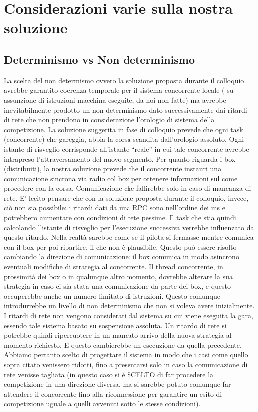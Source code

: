 \section{Considerazioni varie sulla nostra soluzione}
\subsection{Determinismo vs Non determinismo}
La scelta del non determismo ovvero
      la soluzione proposta durante il colloquio avrebbe garantito coerenza temporale per il sistema concorrente locale ( su assunzione di istruzioni macchina eseguite, da noi non fatte) ma avrebbe inevitabilmente prodotto un non determinismo dato successivamente dai ritardi di rete che non prendono in considerazione l’orologio di sistema della competizione. La soluzione suggerita in fase di colloquio prevede che ogni task (concorrente) che gareggia, abbia la corsa scandita dall’orologio assoluto. Ogni istante di risveglio corrisponde all’istante “reale” in cui tale concorrente avrebbe intrapreso l’attraversamento del nuovo segmento. Per quanto riguarda i box (distribuiti), la nostra soluzione prevede che il concorrente instauri una comunicazione sincrona via radio col box per ottenere informazioni sul come procedere con la corsa. Comunicazione che fallirebbe solo in caso di mancanza di rete. E’ lecito pensare che con la soluzione proposta durante il colloquio, invece, ciò non sia possibile: i ritardi dati da una RPC sono nell’ordine dei ms e potrebbero aumentare con condizioni di rete pessime. Il task che stia quindi calcolando l’istante di risveglio per l’esecuzione successiva verrebbe influenzato da questo ritardo. Nella realtà sarebbe come se il pilota si fermasse mentre comunica con il box per poi ripartire, il che non è plausibile. Questo può essere risolto cambiando la direzione di comunicazione: il box comunica in modo asincrono eventuali modifiche di strategia al concorrente. Il thread concorrente, in prossimità dei box o in qualunque altro momento, dovrebbe alterare la sua strategia in caso ci sia stata una comunicazione da parte dei box, e questo occuperebbe anche un numero limitato di istruzioni. Questo comunque introdurrebbe un livello di non determinismo che non si voleva avere inizialmente. I ritardi di rete non vengono considerati dal sistema su cui viene eseguita la gara, essendo tale sistema basato su sospensione assoluta. Un ritardo di rete si potrebbe quindi ripercuotere in un mancato arrivo della nuova strategia al momento richiesto. E questo cambierebbe un esecuzione da  quella precedente. Abbiamo pertanto scelto di progettare il sistema in modo che i casi come quello sopra citato venissero ridotti, fino a presentarsi solo in caso la comunicazione di rete venisse tagliata (in questo caso si è SCELTO di far procedere la competizione in una direzione diversa, ma si sarebbe potuto comunque far attendere il concorrente fino alla riconnessione per garantire un esito di competizione uguale a quelli avvenuti sotto le stesse condizioni).
